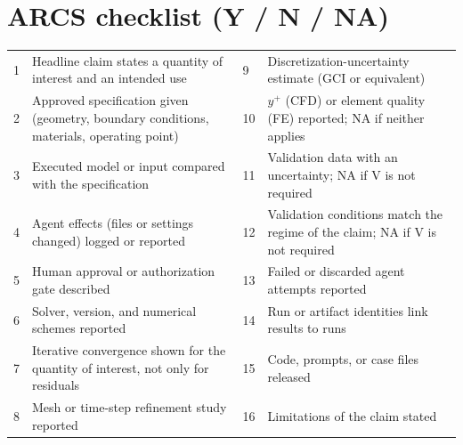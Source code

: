 \documentclass[10pt,a4paper]{article}
\begin{document}
\section{ARCS checklist (Y / N / NA)}
\begin{tabularx}{\textwidth}{p{} L p{0.03\textwidth} L}
1 & Headline claim states a quantity of interest and an intended use & 9 & Discretization-uncertainty estimate (GCI or equivalent) \\
2 & Approved specification given (geometry, boundary conditions, materials, operating point) & 10 & $y^+$ (CFD) or element quality (FE) reported; NA if neither applies \\
3 & Executed model or input compared with the specification & 11 & Validation data with an uncertainty; NA if V is not required \\
4 & Agent effects (files or settings changed) logged or reported & 12 & Validation conditions match the regime of the claim; NA if V is not required \\
5 & Human approval or authorization gate described & 13 & Failed or discarded agent attempts reported \\
6 & Solver, version, and numerical schemes reported & 14 & Run or artifact identities link results to runs \\
7 & Iterative convergence shown for the quantity of interest, not only for residuals & 15 & Code, prompts, or case files released \\
8 & Mesh or time-step refinement study reported & 16 & Limitations of the claim stated \\
\end{tabularx}
\end{document}
